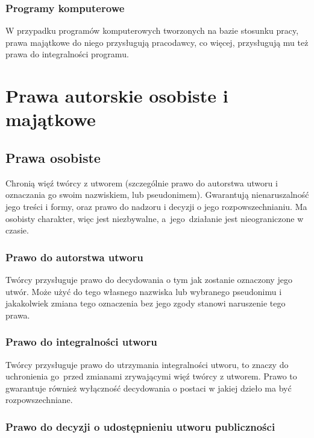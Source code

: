 \documentclass{article}
\begin{document}
\subsubsection{Programy komputerowe}

W przypadku programów komputerowych tworzonych na bazie stosunku pracy, prawa majątkowe do niego przysługują pracodawcy, co więcej, przysługują mu też prawa do integralności programu.

\section{Prawa autorskie osobiste i majątkowe}

\subsection{Prawa osobiste}

Chronią więź twórcy z utworem (szczególnie prawo do autorstwa utworu i oznaczania go swoim nazwiskiem, lub pseudonimem).
Gwarantują nienaruszalność jego treści i formy, oraz prawo do nadzoru i decyzji o jego rozpowszechnianiu.
Ma osobisty charakter, więc jest niezbywalne, a~jego~działanie jest nieograniczone w czasie.

\subsubsection{Prawo do autorstwa utworu}

Twórcy przysługuje prawo do decydowania o tym jak zostanie oznaczony jego utwór.
Może użyć do tego własnego nazwiska lub wybranego pseudonimu i jakakolwiek zmiana tego oznaczenia bez jego zgody stanowi naruszenie tego prawa.

\subsubsection{Prawo do integralności utworu}

Twórcy przysługuje prawo do utrzymania integralności utworu, to znaczy do uchronienia go~przed zmianami zrywającymi więź twórcy z utworem.
Prawo to gwarantuje również wyłączność decydowania o postaci w jakiej dzieło ma być rozpowszechniane.

\subsubsection{Prawo do decyzji o udostępnieniu utworu publiczności}
\end{document}
